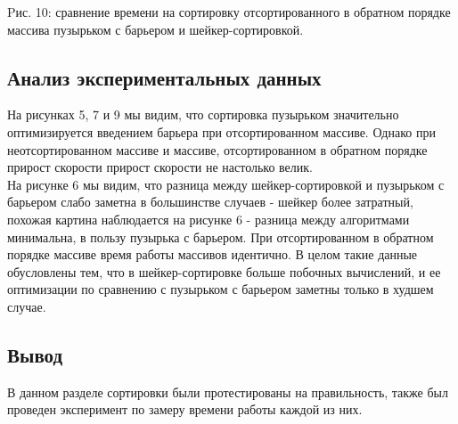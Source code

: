 \documentclass[a4paper, 14pt]{article}
\begin{document}
\begin{center}
\begin{flushleft}
Pис. 10: сравнение времени на сортировку отсортированного в обратном порядке массива пузырьком с барьером и шейкер-сортировкой.\\
\end{flushleft}
\end{center}
\subsection{Анализ экспериментальных данных}
	На рисунках 5, 7 и 9 мы видим, что сортировка пузырьком значительно оптимизируется введением барьера при отсортированном массиве. Однако при неотсортированном массиве и массиве, отсортированном в обратном порядке прирост скорости прирост скорости не настолько велик.\\
	На рисунке 6 мы видим, что разница между шейкер-сортировкой и пузырьком с барьером слабо заметна в большинстве случаев - шейкер более затратный, похожая картина наблюдается на рисунке 6 - разница между алгоритмами минимальна, в пользу пузырька с барьером. При отсортированном в обратном порядке массиве время работы массивов идентично. В целом такие данные обусловлены тем, что в шейкер-сортировке больше побочных вычислений, и ее оптимизации по сравнению с пузырьком с барьером заметны только в худшем случае.
	\subsection{Вывод}
		В данном разделе сортировки были протестированы на правильность, также был проведен эксперимент по замеру времени работы каждой из них.
  


    	\newpage
\end{document}
